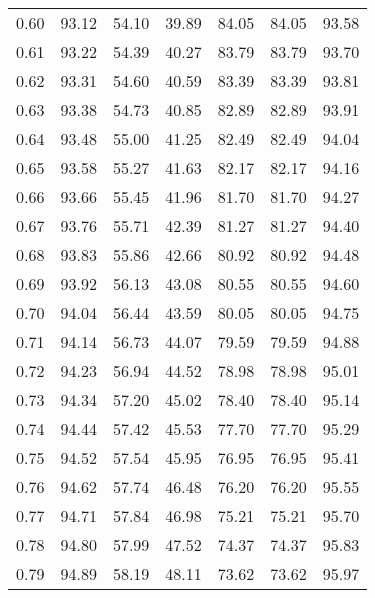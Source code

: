 \begin{tabular}{|c|c|c|c|c|c|c|}
      0.60 &     93.12 &     54.10 &      39.89 &   84.05 &      84.05 &         93.58 \\
      0.61 &     93.22 &     54.39 &      40.27 &   83.79 &      83.79 &         93.70 \\
      0.62 &     93.31 &     54.60 &      40.59 &   83.39 &      83.39 &         93.81 \\
      0.63 &     93.38 &     54.73 &      40.85 &   82.89 &      82.89 &         93.91 \\
      0.64 &     93.48 &     55.00 &      41.25 &   82.49 &      82.49 &         94.04 \\
      0.65 &     93.58 &     55.27 &      41.63 &   82.17 &      82.17 &         94.16 \\
      0.66 &     93.66 &     55.45 &      41.96 &   81.70 &      81.70 &         94.27 \\
      0.67 &     93.76 &     55.71 &      42.39 &   81.27 &      81.27 &         94.40 \\
      0.68 &     93.83 &     55.86 &      42.66 &   80.92 &      80.92 &         94.48 \\
      0.69 &     93.92 &     56.13 &      43.08 &   80.55 &      80.55 &         94.60 \\
      0.70 &     94.04 &     56.44 &      43.59 &   80.05 &      80.05 &         94.75 \\
      0.71 &     94.14 &     56.73 &      44.07 &   79.59 &      79.59 &         94.88 \\
      0.72 &     94.23 &     56.94 &      44.52 &   78.98 &      78.98 &         95.01 \\
      0.73 &     94.34 &     57.20 &      45.02 &   78.40 &      78.40 &         95.14 \\
      0.74 &     94.44 &     57.42 &      45.53 &   77.70 &      77.70 &         95.29 \\
      0.75 &     94.52 &     57.54 &      45.95 &   76.95 &      76.95 &         95.41 \\
      0.76 &     94.62 &     57.74 &      46.48 &   76.20 &      76.20 &         95.55 \\
      0.77 &     94.71 &     57.84 &      46.98 &   75.21 &      75.21 &         95.70 \\
      0.78 &     94.80 &     57.99 &      47.52 &   74.37 &      74.37 &         95.83 \\
      0.79 &     94.89 &     58.19 &      48.11 &   73.62 &      73.62 &         95.97 \\

\end{tabular}
